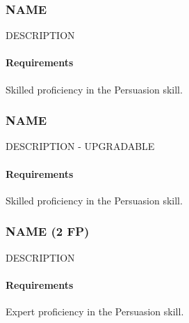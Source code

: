 \subsubsection{NAME} \label{feat::name}
    DESCRIPTION
    \paragraph{Requirements} Skilled proficiency in the Persuasion skill.
\subsubsection{NAME} \label{feat::name}
    DESCRIPTION - UPGRADABLE
    \paragraph{Requirements} Skilled proficiency in the Persuasion skill.
\subsubsection{NAME (2 FP)} \label{feat::name}
    DESCRIPTION
    \paragraph{Requirements} Expert proficiency in the Persuasion skill.

